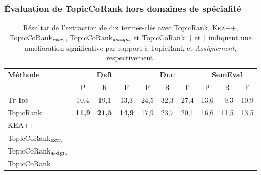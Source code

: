      \subsubsection{Évaluation de TopicCoRank hors domaines de spécialité}
      \label{subsubsec:main-domain_specific_keyphrase_annotation-supervised_automatic_keyphrase_annotation-evaluation-topiccorank_indepent_domains}
        \begin{table}[h!]
          \centering
            \begin{tabular}{l|ccc|ccc|ccc}
              \toprule
              \multirow{2}{*}{\textbf{Méthode}} & \multicolumn{3}{c|}{\textbf{\textsc{De}ft}} & \multicolumn{3}{c|}{\textbf{\textsc{Duc}}} & \multicolumn{3}{c}{\textbf{SemEval}}\\
              \cline{2-10}
              & P & R & F & P & R & F & P & R & F\\
              \hline
              \textsc{Tf-Idf} & 10,4 & 19,1 & 13,3 & 24,5 & 32,3 & 27,4 & 13,6 & $~~$9,3 & 10,9\\
              TopicRank & \textbf{11,9} & \textbf{21,5} & \textbf{14,9} & 17,9 & 23,7 & 20,1 & 16,6 & 11,5 & 13,5\\
              KEA++ & --- & --- & ---$^{~~}$ & --- & --- & ---$^{~~}$ & --- & --- & ---\\
              \hline
              TopicCoRank$_\textnormal{extr.}$ & & & & & & & & & \\
              TopicCoRank$_\textnormal{assign.}$ & & & & & & & & & \\
              \hline
              TopicCoRank & & & & & & & & & \\
              \bottomrule
            \end{tabular}
        \caption[
          Résultat de l'extraction de dix termes-clés avec TopicRank,
          \textsc{Kea++}, TopicCoRank$_\textnormal{\textit{extr.}}$,
          TopicCoRank$_\textnormal{\textit{assign.}}$ et TopicCoRank
        ]{
          Résultat de l'extraction de dix termes-clés avec TopicRank,
          \textsc{Kea++}, TopicCoRank$_\textnormal{\textit{extr.}}$,
          TopicCoRank$_\textnormal{\textit{assign.}}$ et TopicCoRank. $\dagger$
          et $\ddagger$ indiquent une amélioration significative par rapport à
          TopicRank et \textit{Assignement}, respectivement.
          \label{tab:topiccorank-comparison_results}}
        \end{table}


